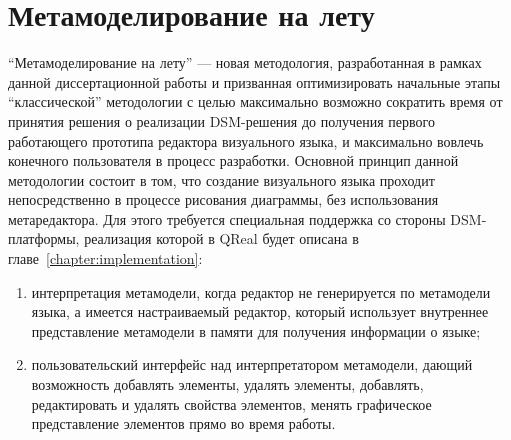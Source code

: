 \section{Метамоделирование на лету}
\label{chapter:metamodelingOnFly}
"`Метамоделирование на лету"' --- новая методология, разработанная в рамках данной 
диссертационной работы и призванная оптимизировать начальные этапы "`классической"' 
методологии с целью максимально возможно сократить время от принятия решения о реализации 
DSM-решения до получения первого работающего прототипа редактора визуального языка, 
и максимально вовлечь конечного пользователя в процесс разработки. Основной принцип 
данной методологии состоит в том, что создание визуального языка проходит непосредственно 
в процессе рисования диаграммы, без использования метаредактора. Для этого требуется 
специальная поддержка со стороны DSM-платформы, реализация которой в QReal будет описана 
в главе~\ref{chapter:implementation}:
\begin{enumerate}
	\item интерпретация метамодели, когда редактор не генерируется по метамодели языка, 
		а имеется настраиваемый редактор, который использует внутреннее представление 
		метамодели в памяти для получения информации о языке;
	\item пользовательский интерфейс над интерпретатором метамодели, дающий возможность 
		добавлять элементы, удалять элементы, добавлять, редактировать и удалять свойства 
		элементов, менять графическое представление элементов прямо во время работы.
\end{enumerate}

